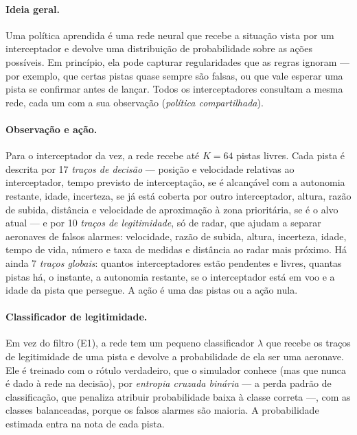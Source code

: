 \paragraph{Ideia geral.} Uma política aprendida é uma rede neural que recebe a situação vista por um interceptador e
devolve uma distribuição de probabilidade sobre as ações possíveis. Em princípio, ela pode capturar regularidades que as
regras ignoram --- por exemplo, que certas pistas quase sempre são falsas, ou que vale esperar uma pista se confirmar antes
de lançar. Todos os interceptadores consultam a mesma rede, cada um com a sua observação (\emph{política compartilhada}).

\paragraph{Observação e ação.} Para o interceptador da vez, a rede recebe até $K=64$ pistas livres. Cada pista é descrita
por 17 \emph{traços de decisão} --- posição e velocidade relativas ao interceptador, tempo previsto de interceptação, se é
alcançável com a autonomia restante, idade, incerteza, se já está coberta por outro interceptador, altura, razão de
subida, distância e velocidade de aproximação à zona prioritária, se é o alvo atual --- e por 10 \emph{traços de
legitimidade}, só de radar, que ajudam a separar aeronaves de falsos alarmes: velocidade, razão de subida, altura,
incerteza, idade, tempo de vida, número e taxa de medidas e distância ao radar mais próximo. Há ainda 7 \emph{traços
globais}: quantos interceptadores estão pendentes e livres, quantas pistas há, o instante, a autonomia restante, se o
interceptador está em voo e a idade da pista que persegue. A ação é uma das pistas ou a ação nula.

\paragraph{Classificador de legitimidade.} Em vez do filtro (E1), a rede tem um pequeno classificador $\lambda$ que
recebe os traços de legitimidade de uma pista e devolve a probabilidade de ela ser uma aeronave. Ele é treinado com o
rótulo verdadeiro, que o simulador conhece (mas que nunca é dado à rede na decisão), por \emph{entropia cruzada binária}
--- a perda padrão de classificação, que penaliza atribuir probabilidade baixa à classe correta ---, com as classes
balanceadas, porque os falsos alarmes são maioria. A probabilidade estimada entra na nota de cada pista.

